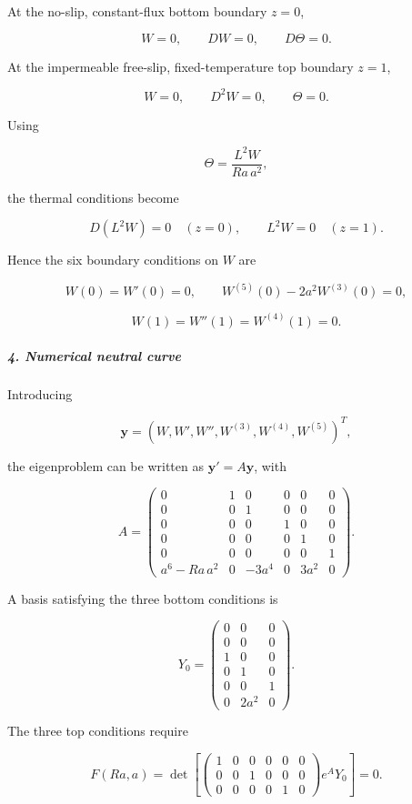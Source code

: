 At the no-slip, constant-flux bottom boundary $z=0$,

\[
W=0,\qquad DW=0,\qquad D\Theta=0.
\]

At the impermeable free-slip, fixed-temperature top boundary $z=1$,

\[
W=0,\qquad D^2W=0,\qquad \Theta=0.
\]

Using

\[
\Theta=\frac{L^2W}{Ra\,a^2},
\]

the thermal conditions become

\[
D(L^2W)=0\quad(z=0), \qquad L^2W=0\quad(z=1).
\]

Hence the six boundary conditions on $W$ are

\[
W(0)=W'(0)=0, \qquad W^{(5)}(0)-2a^2W^{(3)}(0)=0,
\]

\[
W(1)=W''(1)=W^{(4)}(1)=0.
\]

\subparagraph*{4. Numerical neutral curve}

Introducing

\[
\mathbf y=(W,W',W'',W^{(3)},W^{(4)},W^{(5)})^T,
\]

the eigenproblem can be written as $\mathbf y'=A\mathbf y$, with

\[
A=
\begin{pmatrix}
0&1&0&0&0&0\\
0&0&1&0&0&0\\
0&0&0&1&0&0\\
0&0&0&0&1&0\\
0&0&0&0&0&1\\
a^6-Ra\,a^2&0&-3a^4&0&3a^2&0
\end{pmatrix}.
\]

A basis satisfying the three bottom conditions is

\[
Y_0=
\begin{pmatrix}
0&0&0\\
0&0&0\\
1&0&0\\
0&1&0\\
0&0&1\\
0&2a^2&0
\end{pmatrix}.
\]

The three top conditions require

\[
F(Ra,a)
=
\det\!\left[
\begin{pmatrix}
1&0&0&0&0&0\\
0&0&1&0&0&0\\
0&0&0&0&1&0
\end{pmatrix}
e^A Y_0
\right]=0.
\]

